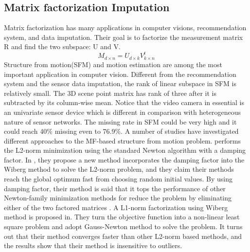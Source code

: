 \subsection{Matrix factorization Imputation }
Matrix factorization has many applications in computer visions, recommendation system, and data imputation. Their goal is to factorize the measurement matrix R and find the two subspace: U and V. 
\begin{equation}
M_{d\times n}= U_{d\times k}V^t_{k\times n}
\end{equation} 
Structure from motion(SFM)\cite{tomasi1992shape} and motion estimation are among the most important application in computer vision. Different from the recommendation system and the sensor data imputation, the rank of linear subspace in SFM is relatively small. The 3D scene point matrix has rank of three after it is subtracted by its column-wise mean. Notice that the video camera in essential is an univariate sensor device which is different in comparison with heterogeneous nature of sensor networks. The missing rate in SFM could be very high and it could reach 40\% missing\cite{ke2005robust} even to 76.9\%\cite{deguchi2011efficient}.  A number of studies have investigated different approaches to the MF-based structure from motion problem. \cite{buchanan2005damped} performs the L2-norm minimization using the standard Newton algorithm with a damping factor. In \cite{deguchi2011efficient}, they propose a new method incorporates the damping factor into the Wiberg method to solve the L2-norm problem, and they claim their methods reach the global optimum fast from choosing random initial values. By using damping factor, their method is said that it tops the performance of other Newton-family minimization methods for reduce the problem by eliminating either of the two factored matrices . A L1-norm factorization using Wiberg method is proposed in\cite{eriksson2010efficient}. They turn the objective function into a non-linear least square problem and adopt Gauss-Newton method to solve the problem. It turns out that their method converges faster than other L2-norm based methods, and the results show that their method is insensitive to outliers. 
